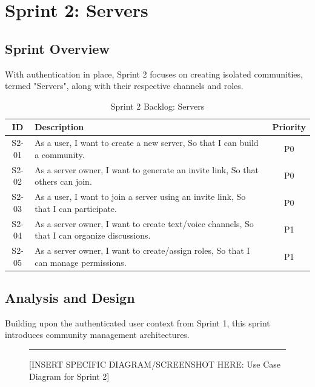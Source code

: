 \section{Sprint 2: Servers}

\subsection{Sprint Overview}
With authentication in place, Sprint 2 focuses on creating isolated communities, termed "Servers", along with their respective channels and roles.

\begin{table}[h!]
    \centering
    \begin{tabular}{|c|p{10cm}|c|}
        \hline
        \textbf{ID} & \textbf{Description} & \textbf{Priority} \\
        \hline
        S2-01 & As a user, I want to create a new server, So that I can build a community. & P0 \\
        \hline
        S2-02 & As a server owner, I want to generate an invite link, So that others can join. & P0 \\
        \hline
        S2-03 & As a user, I want to join a server using an invite link, So that I can participate. & P0 \\
        \hline
        S2-04 & As a server owner, I want to create text/voice channels, So that I can organize discussions. & P1 \\
        \hline
        S2-05 & As a server owner, I want to create/assign roles, So that I can manage permissions. & P1 \\
        \hline
    \end{tabular}
    \caption{Sprint 2 Backlog: Servers}
    \label{tab:sprint2_backlog}
\end{table}

\subsection{Analysis and Design}
Building upon the authenticated user context from Sprint 1, this sprint introduces community management architectures.

\begin{figure}[h!]
    \centering
    \rule{0.8\textwidth}{5cm} %
    \caption{[INSERT SPECIFIC DIAGRAM/SCREENSHOT HERE: Use Case Diagram for Sprint 2]}
    \label{fig:sprint2_usecase}
\end{figure}

